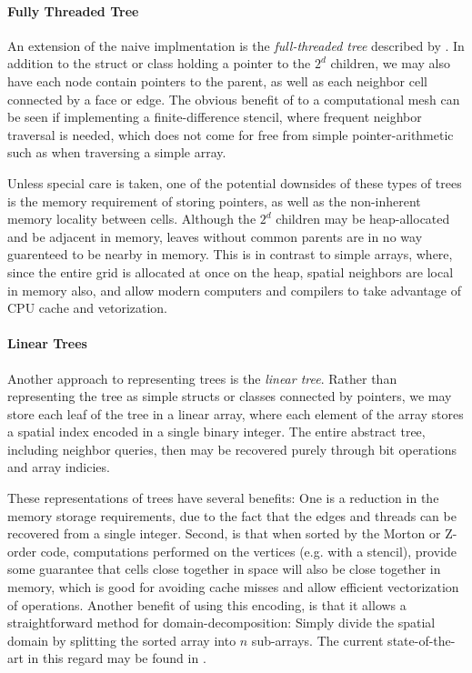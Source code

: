\paragraph{Fully Threaded Tree}
An extension of the naive implmentation is the \emph{full-threaded tree}
described by \textcite{khokhlov_fully_1998}. In addition to the struct or class
holding a pointer to the \(2^d\) children, we may also have each node contain
pointers to the parent, as well as each neighbor cell connected by a face or
edge. The obvious benefit of to a computational mesh can be seen if
implementing a finite-difference stencil, where frequent neighbor traversal is
needed, which does not come for free from simple pointer-arithmetic such as
when traversing a simple array.

Unless special care is taken, one of the potential downsides of these types of
trees is the memory requirement of storing pointers, as well as the
non-inherent memory locality between cells. Although the \(2^d\) children may
be heap-allocated and be adjacent in memory, leaves without common parents are
in no way guarenteed to be nearby in memory. This is in contrast to simple
arrays, where, since the entire grid is allocated at once on the heap, spatial
neighbors are local in memory also, and allow modern computers and compilers to
take advantage of CPU cache and vetorization.

\paragraph{Linear Trees}
Another approach to representing trees is the \emph{linear tree}. Rather than
representing the tree as simple structs or classes connected by pointers, we
may store each leaf of the tree in a linear array, where each element of the
array stores a spatial index encoded in a single binary integer. The entire
abstract tree, including neighbor queries, then may be recovered purely through
bit operations and array indicies.

These representations of trees have several benefits: One is a reduction in the
memory storage requirements, due to the fact that the edges and threads can be
recovered from a single integer. Second, is that when sorted by the Morton or
Z-order code, computations performed on the vertices (e.g. with a stencil),
provide some guarantee that cells close together in space will also be close
together in memory, which is good for avoiding {cache misses} and allow
efficient vectorization of operations. Another benefit of using this encoding,
is that it allows a straightforward method for domain-decomposition: Simply
divide the spatial domain by splitting the sorted array into \(n\) sub-arrays.
The current state-of-the-art in this regard may be found in
\textcite{burstedde_p4est_2011}.

